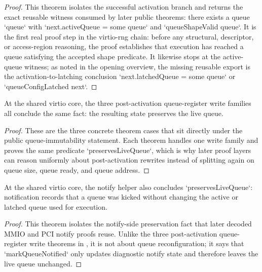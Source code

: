 \begin{proof}
\leanok
{}
This theorem isolates the successful activation branch and returns the exact reusable witness consumed by later public theorems: there exists a queue `queue` with `next.activeQueue = some queue` and `queueShapeValid queue`.
It is the first real proof step in the virtio-rng chain: before any structural, descriptor, or access-region reasoning, the proof establishes that execution has reached a queue satisfying the accepted shape predicate.
It likewise stops at the active-queue witness; as noted in the opening overview, the missing reusable export is the activation-to-latching conclusion `next.latchedQueue = some queue` or `queueConfigLatched next`.
\end{proof}

\begin{theorem}
\label{thm:core-write-preservation}
\leanok
At the shared virtio core, the three post-activation queue-register write families all conclude the same fact: the resulting state preserves the live queue.
\end{theorem}

\begin{proof}
\leanok
{}
These are the three concrete theorem cases that sit directly under the public queue-immutability statement.
Each theorem handles one write family and proves the same predicate `preservesLiveQueue`, which is why later proof layers can reason uniformly about post-activation rewrites instead of splitting again on queue size, queue ready, and queue address.
\end{proof}

\begin{theorem}
\label{thm:notify-preserves-live-queue}
\leanok
At the shared virtio core, the notify helper also concludes `preservesLiveQueue`: notification records that a queue was kicked without changing the active or latched queue used for execution.
\end{theorem}

\begin{proof}
\leanok
{}
This theorem isolates the notify-side preservation fact that later decoded MMIO and PCI notify proofs reuse.
Unlike the three post-activation queue-register write theorems in , it is not about queue reconfiguration; it says that `markQueueNotified` only updates diagnostic notify state and therefore leaves the live queue unchanged.
\end{proof}

